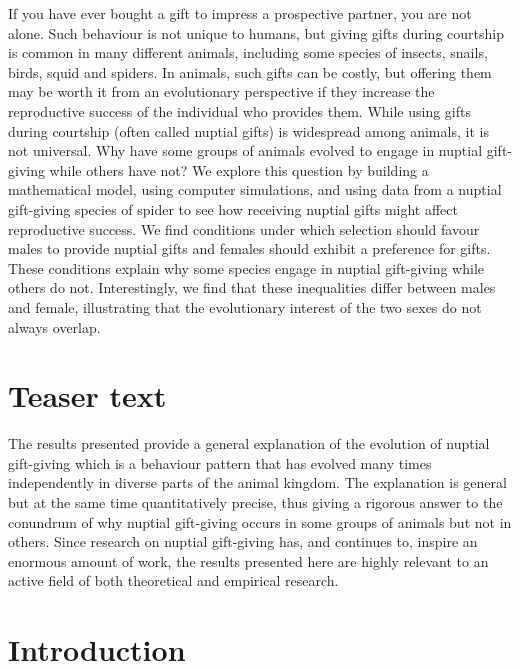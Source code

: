 \documentclass[
]{article}
\begin{document}
If you have ever bought a gift to impress a prospective partner, you are
not alone. Such behaviour is not unique to humans, but giving gifts
during courtship is common in many different animals, including some
species of insects, snails, birds, squid and spiders. In animals, such
gifts can be costly, but offering them may be worth it from an
evolutionary perspective if they increase the reproductive success of
the individual who provides them. While using gifts during courtship
(often called nuptial gifts) is widespread among animals, it is not
universal. Why have some groups of animals evolved to engage in nuptial
gift-giving while others have not? We explore this question by building
a mathematical model, using computer simulations, and using data from a
nuptial gift-giving species of spider to see how receiving nuptial gifts
might affect reproductive success. We find conditions under which
selection should favour males to provide nuptial gifts and females
should exhibit a preference for gifts. These conditions explain why some
species engage in nuptial gift-giving while others do not.
Interestingly, we find that these inequalities differ between males and
female, illustrating that the evolutionary interest of the two sexes do
not always overlap.

\hypertarget{teaser-text}{%
\section{Teaser text}\label{teaser-text}}

The results presented provide a general explanation of the evolution of
nuptial gift-giving which is a behaviour pattern that has evolved many
times independently in diverse parts of the animal kingdom. The
explanation is general but at the same time quantitatively precise, thus
giving a rigorous answer to the conundrum of why nuptial gift-giving
occurs in some groups of animals but not in others. Since research on
nuptial gift-giving has, and continues to, inspire an enormous amount of
work, the results presented here are highly relevant to an active field
of both theoretical and empirical research.

\hypertarget{introduction}{%
\section{Introduction}\label{introduction}}
\end{document}
